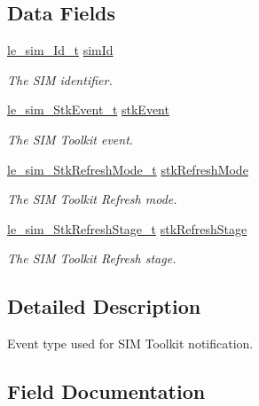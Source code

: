 \subsection*{Data Fields}
\begin{DoxyCompactItemize}
\item 
\hyperlink{le__sim__interface_8h_aace49df88426119626fb1ef4e544ccdd}{le\+\_\+sim\+\_\+\+Id\+\_\+t} \hyperlink{structpa__sim___stk_event__t_ab0eb2008b8bbf7c8c0cd5ad537374246}{sim\+Id}
\begin{DoxyCompactList}\small\item\em The S\+IM identifier. \end{DoxyCompactList}\item 
\hyperlink{le__sim__interface_8h_a7c53ab7f9f004387ef41e80df1121da2}{le\+\_\+sim\+\_\+\+Stk\+Event\+\_\+t} \hyperlink{structpa__sim___stk_event__t_a88ef10583b8c8a008665548c3bd6b31c}{stk\+Event}
\begin{DoxyCompactList}\small\item\em The S\+IM Toolkit event. \end{DoxyCompactList}\item 
\hyperlink{le__sim__interface_8h_acf932502f1fa004dfcdd72ea2049d4eb}{le\+\_\+sim\+\_\+\+Stk\+Refresh\+Mode\+\_\+t} \hyperlink{structpa__sim___stk_event__t_a395ef063318c0ff0b89837189149891f}{stk\+Refresh\+Mode}
\begin{DoxyCompactList}\small\item\em The S\+IM Toolkit Refresh mode. \end{DoxyCompactList}\item 
\hyperlink{le__sim__interface_8h_a99369a750db46ea1a5acb8cde0eef690}{le\+\_\+sim\+\_\+\+Stk\+Refresh\+Stage\+\_\+t} \hyperlink{structpa__sim___stk_event__t_aaab2fdc9d85ea43b09869b0708c11f4a}{stk\+Refresh\+Stage}
\begin{DoxyCompactList}\small\item\em The S\+IM Toolkit Refresh stage. \end{DoxyCompactList}\end{DoxyCompactItemize}


\subsection{Detailed Description}
Event type used for S\+IM Toolkit notification. 

\subsection{Field Documentation}
